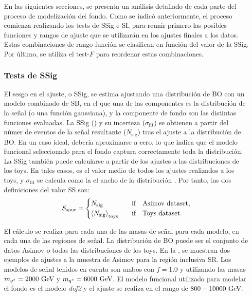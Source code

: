 En las siguientes secciones, se presenta un análisis detallado de cada parte del proceso de modelización del fondo. Como se indicó anteriormente, el proceso comienza realizando los tests de \ac{SSig} e \ac{SI}, para reunir primero las posibles funciones y rangos de ajuste que se utilizarán en los ajustes finales a los datos. Estas combinaciones de rango-función se clasifican en función del valor de la \ac{SSig}. Por último, se utiliza el test-\(F\) para reordenar estas combinaciones.


\subsubsection{Tests de \acl{SSig}}
\label{subsubsec:bkg:modeling:sigbkg:sstest}

El sesgo en el ajuste, o \acf{SSig}, se estima ajustando una distribución de \ac{BO} con un modelo combinado de \ac{SB}, en el que una de las componentes es la distribución de la señal (o una función gaussiana), y la componente de fondo son las distintas funciones evaluadas.
La \ac{SSig} (\sspur) y su incerteza (\(\sigma_{\text{fit}}\)) se obtienen a partir del númer de eventos de la señal resultante (\(N_{\text{sig}}\)) tras el ajuste a la distribución de \ac{BO}. En un caso ideal, \sspur debería aproximarse a cero, lo que indica que el modelo funcional seleccionado para el fondo captura correctamente toda la distribución.
La \ac{SSig} también puede calcularse a partir de los ajustes a las distribuciones de los toys. En tales casos, \sspur es el valor medio de todos los ajustes realizados a los toys, y \(\sigma_{\text{fit}}\) se calcula como la el ancho de la distribución \sspur. Por tanto, las dos definiciones del valor \ac{SS} son:
\begin{equation}
    \label{eq:bkg:modeling:sigbkg:sstest:sspur_definition_sstest}
    \sspur = 
    \begin{cases}
        N_{\text{sig}} & \qif \text{Asimov dataset},\\
        \expval{N_{\text{sig}}}_{\text{toys}} & \qif \text{Toys dataset}.
    \end{cases}
\end{equation}

El cálculo se realiza para cada una de las masas de señal para cada modelo, en cada una de las regiones de señal. La distribución de \ac{BO} puede ser el conjunto de datos Asimov o todas las distribuciones de los toys. En la \Fig{\ref{fig:bkg:modeling:sigbkg:sstest:sstest_asimov_examples}}, se muestran dos ejemplos de ajustes a la muestra de Asimov para la región inclusiva SR. Los modelos de señal tenidos en cuenta son ambos \qstar con \(f=1.0\) y utilizando las masas \(m_{q^*} = 2000~\text{GeV}\) y \(m_{q^*} = 6000~\text{GeV}\). El modelo funcional utilizado para modelar el fondo es el modelo \textit{dof2} y el ajuste se realiza en el rango \myj de \(800-10000~\text{GeV}\).

